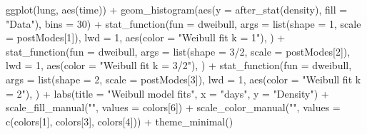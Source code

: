 \documentclass[
  letterpaper,
  DIV=11,
  numbers=noendperiod]{scrartcl}
\newenvironment{Shaded}{\begin{snugshade}}{\end{snugshade}}
\newcommand{\AttributeTok}[1]{\textcolor[rgb]{0.40,0.45,0.13}{#1}}
\newcommand{\DecValTok}[1]{\textcolor[rgb]{0.68,0.00,0.00}{#1}}
\newcommand{\FunctionTok}[1]{\textcolor[rgb]{0.28,0.35,0.67}{#1}}
\newcommand{\NormalTok}[1]{\textcolor[rgb]{0.00,0.23,0.31}{#1}}
\newcommand{\SpecialCharTok}[1]{\textcolor[rgb]{0.37,0.37,0.37}{#1}}
\newcommand{\StringTok}[1]{\textcolor[rgb]{0.13,0.47,0.30}{#1}}
\begin{document}
\begin{tcolorbox}
\begin{Shaded}
\begin{Highlighting}[]
\FunctionTok{ggplot}\NormalTok{(lung, }\FunctionTok{aes}\NormalTok{(time)) }\SpecialCharTok{+}
  \FunctionTok{geom\_histogram}\NormalTok{(}\FunctionTok{aes}\NormalTok{(}\AttributeTok{y =} \FunctionTok{after\_stat}\NormalTok{(density), }\AttributeTok{fill =} \StringTok{"Data"}\NormalTok{), }\AttributeTok{bins =} \DecValTok{30}\NormalTok{) }\SpecialCharTok{+}
  \FunctionTok{stat\_function}\NormalTok{(}\AttributeTok{fun =}\NormalTok{ dweibull, }\AttributeTok{args =} \FunctionTok{list}\NormalTok{(}\AttributeTok{shape =} \DecValTok{1}\NormalTok{, }\AttributeTok{scale =}\NormalTok{ postModes[}\DecValTok{1}\NormalTok{]), }\AttributeTok{lwd =} \DecValTok{1}\NormalTok{, }
                \FunctionTok{aes}\NormalTok{(}\AttributeTok{color =} \StringTok{"Weibull fit k = 1"}\NormalTok{),}
\NormalTok{  ) }\SpecialCharTok{+}
  \FunctionTok{stat\_function}\NormalTok{(}\AttributeTok{fun =}\NormalTok{ dweibull, }\AttributeTok{args =} \FunctionTok{list}\NormalTok{(}\AttributeTok{shape =} \DecValTok{3}\SpecialCharTok{/}\DecValTok{2}\NormalTok{, }\AttributeTok{scale =}\NormalTok{ postModes[}\DecValTok{2}\NormalTok{]), }\AttributeTok{lwd =} \DecValTok{1}\NormalTok{, }
                \FunctionTok{aes}\NormalTok{(}\AttributeTok{color =} \StringTok{"Weibull fit k = 3/2"}\NormalTok{),}
\NormalTok{  ) }\SpecialCharTok{+}
  \FunctionTok{stat\_function}\NormalTok{(}\AttributeTok{fun =}\NormalTok{ dweibull, }\AttributeTok{args =} \FunctionTok{list}\NormalTok{(}\AttributeTok{shape =} \DecValTok{2}\NormalTok{, }\AttributeTok{scale =}\NormalTok{ postModes[}\DecValTok{3}\NormalTok{]), }\AttributeTok{lwd =} \DecValTok{1}\NormalTok{, }
                \FunctionTok{aes}\NormalTok{(}\AttributeTok{color =} \StringTok{"Weibull fit k = 2"}\NormalTok{),}
\NormalTok{  ) }\SpecialCharTok{+}
  \FunctionTok{labs}\NormalTok{(}\AttributeTok{title =} \StringTok{"Weibull model fits"}\NormalTok{, }\AttributeTok{x =} \StringTok{"days"}\NormalTok{, }\AttributeTok{y =} \StringTok{"Density"}\NormalTok{) }\SpecialCharTok{+} 
  \FunctionTok{scale\_fill\_manual}\NormalTok{(}\StringTok{""}\NormalTok{, }\AttributeTok{values =}\NormalTok{ colors[}\DecValTok{6}\NormalTok{]) }\SpecialCharTok{+}
  \FunctionTok{scale\_color\_manual}\NormalTok{(}\StringTok{""}\NormalTok{, }\AttributeTok{values =} \FunctionTok{c}\NormalTok{(colors[}\DecValTok{1}\NormalTok{], colors[}\DecValTok{3}\NormalTok{], colors[}\DecValTok{4}\NormalTok{])) }\SpecialCharTok{+}
  \FunctionTok{theme\_minimal}\NormalTok{()}
\end{Highlighting}
\end{Shaded}


\end{tcolorbox}
\end{document}
